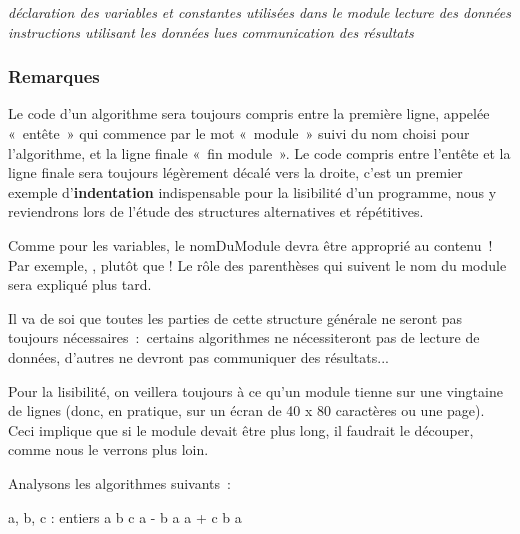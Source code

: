 		\begin{Pseudocode}
			\Stmt \textit{déclaration des variables et constantes utilisées dans le module}
			\Stmt \textit{lecture des données}
			\Stmt \textit{instructions utilisant les données lues}
			\Stmt \textit{communication des résultats}
		\EndModule
		\end{Pseudocode}

		\subsubsection*{Remarques}
		
		\begin{liste}
		\item {
			Le code d’un algorithme sera toujours compris entre la
			première ligne, appelée «~entête~» qui commence par 
			le mot «~module~»
			suivi du nom choisi pour l’algorithme, et la ligne
			finale «~fin module~». Le code compris entre l’entête
			et la ligne finale sera toujours légèrement décalé vers la droite,
			c’est un premier exemple
			d’\textbf{indentation} indispensable pour la
			lisibilité d’un programme, nous y reviendrons lors de
			l’étude des structures alternatives et répétitives.}
		\item {
			Comme pour les variables, le nomDuModule devra être approprié au
            contenu~! Par exemple, , 
			 plutôt que 
			\pseudocode{goPartez()}!
			Le rôle des parenthèses qui suivent le nom du module sera expliqué plus
			tard.}
		\item {
			Il va de soi que toutes les parties de cette structure générale ne
			seront pas toujours nécessaires~:~certains algorithmes ne nécessiteront
			pas de lecture de données, d’autres ne devront pas
			communiquer des résultats...}
		\item {
			Pour la lisibilité, on veillera toujours à ce qu’un module
			tienne sur une vingtaine de lignes (donc, en pratique, sur un écran 
			de 40 x 80 caractères ou une page). Ceci implique que si le module 
			devait être plus long, il faudrait le découper, comme nous le verrons 
			plus loin.}
		\end{liste}

		\bigskip

		Analysons les algorithmes suivants~:
		
		\begin{Pseudocode}
		\Module{exempleValide}{}{}
			\Decl a, b, c : entiers
			\Let a \Gets 12
			\Let b \Gets 5
			\Let c \Gets a - b
			\Let a \Gets a + c
			\Let b \Gets a
		\EndModule
		\end{Pseudocode}
		
